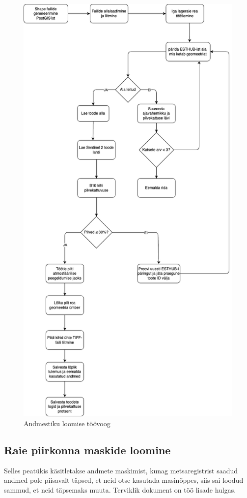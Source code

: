 \begin{figure}[H]
    \centering
    \includegraphics[width=.6\textwidth]{figures/andmestik/andmete_voog.drawio.png}
    \caption{Andmestiku loomise töövoog}
    \label{fig:terveflow}
\end{figure}

\subsection{Raie piirkonna maskide loomine}
Selles peatükis käsitletakse andmete maskimist, kunag metsaregistrist saadud andmed pole piisavalt täpsed, et neid otse kasutada masinõppes, siis sai loodud sammud, et neid täpsemaks muuta. Terviklik dokument on  töö lisade hulgas.

